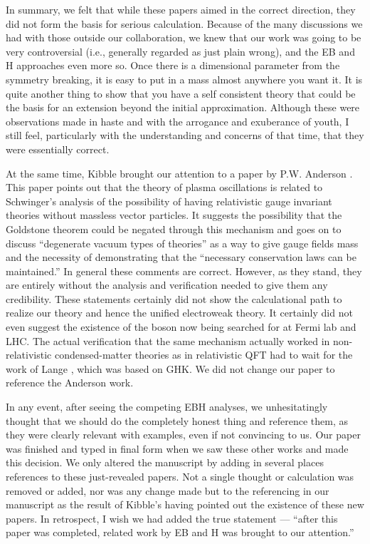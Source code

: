 \documentclass[12pt]{article}
\begin{document}
  In summary, we felt that while these papers aimed in the correct direction,
  they did not form the basis for serious calculation. Because of the many
  discussions we had with those outside our collaboration, we knew that our
  work was going to be very controversial (i.e., generally regarded as just
  plain wrong), and the EB and H approaches even more so. Once there is a
  dimensional parameter from the symmetry breaking, it is easy to put in a
  mass almost anywhere you want it. It is quite another thing to show that you
  have a self consistent theory that could be the basis for an extension
  beyond the initial approximation. Although these were observations made in
  haste and with the arrogance and exuberance of youth, I still feel,
  particularly with the understanding and concerns of that time, that they
  were essentially correct.

   At the same time, Kibble brought our attention to a paper by P.W. Anderson
   \cite{pwa;1963}. This paper points out that the theory of plasma oscillations is
   related to Schwinger's analysis of the possibility of having relativistic
   gauge invariant theories without massless vector particles. It suggests the
   possibility that the Goldstone theorem could be negated through this
   mechanism and goes on to discuss ``degenerate vacuum types of theories'' as
   a way to give gauge fields mass and the necessity of demonstrating that the
   ``necessary conservation laws can be maintained.''  In general these
   comments are correct. However, as they stand, they are entirely without the
   analysis and verification needed to give them any credibility. These
   statements certainly did not show the calculational path to realize our
   theory and hence the unified electroweak theory.  It certainly did not even
   suggest the existence of the boson now being searched for at Fermi lab and
   LHC. The actual verification that the same mechanism actually worked in
   non-relativistic condensed-matter theories as in relativistic QFT had to
   wait for the work of Lange \cite{rvl;1965}, which was based on GHK. We did not
   change our paper to reference the Anderson work.

   In any event, after seeing the competing EBH analyses, we unhesitatingly
   thought that we should do the completely honest thing and reference them,
   as they were clearly relevant with examples, even if not convincing to us.
   Our paper was finished and typed in final form when we saw these other
   works and made this decision. We only altered the manuscript by adding in
   several places references to these just-revealed papers. Not a single
   thought or calculation was removed or added, nor was any change made but to
   the referencing in our manuscript as the result of Kibble's having pointed
   out the existence of these new papers. In retrospect, I wish we had added
   the true statement --- ``after this paper was completed, related work by EB
   and H was brought to our attention.''
\end{document}
